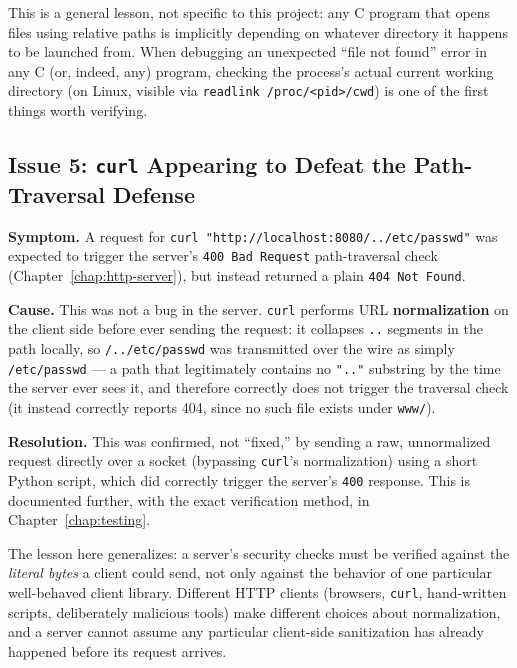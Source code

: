 \begin{warnbox}
This is a general lesson, not specific to this project: any C program that opens files using relative paths is implicitly depending on whatever directory it happens to be launched from. When debugging an unexpected ``file not found'' error in any C (or, indeed, any) program, checking the process's actual current working directory (on Linux, visible via \texttt{readlink /proc/\textless pid\textgreater/cwd}) is one of the first things worth verifying.
\end{warnbox}

\subsection{Issue 5: \texttt{curl} Appearing to Defeat the Path-Traversal Defense}

\textbf{Symptom.} A request for \texttt{curl "http://localhost:8080/../etc/passwd"} was expected to trigger the server's \texttt{400 Bad Request} path-traversal check (Chapter~\ref{chap:http-server}), but instead returned a plain \texttt{404 Not Found}.

\textbf{Cause.} This was not a bug in the server. \texttt{curl} performs URL \textbf{normalization} on the client side before ever sending the request: it collapses \texttt{..} segments in the path locally, so \texttt{/../etc/passwd} was transmitted over the wire as simply \texttt{/etc/passwd} --- a path that legitimately contains no \texttt{".."} substring by the time the server ever sees it, and therefore correctly does not trigger the traversal check (it instead correctly reports 404, since no such file exists under \texttt{www/}).

\textbf{Resolution.} This was confirmed, not ``fixed,'' by sending a raw, unnormalized request directly over a socket (bypassing \texttt{curl}'s normalization) using a short Python script, which did correctly trigger the server's \texttt{400} response. This is documented further, with the exact verification method, in Chapter~\ref{chap:testing}.

\begin{note}
The lesson here generalizes: a server's security checks must be verified against the \emph{literal bytes} a client could send, not only against the behavior of one particular well-behaved client library. Different HTTP clients (browsers, \texttt{curl}, hand-written scripts, deliberately malicious tools) make different choices about normalization, and a server cannot assume any particular client-side sanitization has already happened before its request arrives.
\end{note}
